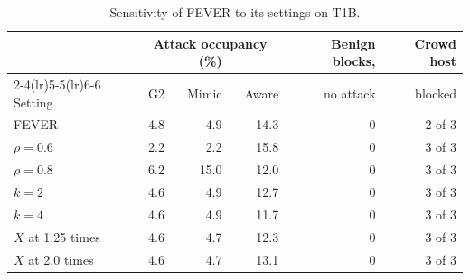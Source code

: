 \begin{table}[t]
\centering
\caption{Sensitivity of FEVER to its settings on T1B.}
\label{tab:sens}
\footnotesize
\setlength{\tabcolsep}{3pt}
\begin{tabular}{lrrrrr}
\toprule
& \multicolumn{3}{c}{Attack occupancy (\%)} & Benign blocks, & Crowd host \\
\cmidrule(lr){2-4}\cmidrule(lr){5-5}\cmidrule(lr){6-6}
Setting & G2 & Mimic & Aware & no attack & blocked \\
\midrule
FEVER & 4.8 & 4.9 & 14.3 & 0 & 2 of 3 \\
$\rho = 0.6$ & 2.2 & 2.2 & 15.8 & 0 & 3 of 3 \\
$\rho = 0.8$ & 6.2 & 15.0 & 12.0 & 0 & 3 of 3 \\
$k = 2$ & 4.6 & 4.9 & 12.7 & 0 & 3 of 3 \\
$k = 4$ & 4.6 & 4.9 & 11.7 & 0 & 3 of 3 \\
$X$ at 1.25 times & 4.6 & 4.7 & 12.3 & 0 & 3 of 3 \\
$X$ at 2.0 times & 4.6 & 4.7 & 13.1 & 0 & 3 of 3 \\
\bottomrule
\end{tabular}
\end{table}
